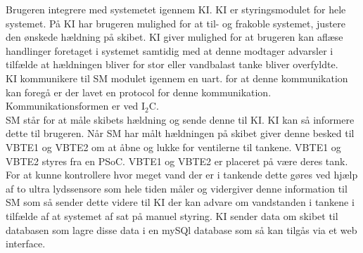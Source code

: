 Brugeren integrere med systemetet igennem KI. KI er styringsmodulet for hele systemet. På KI har brugeren mulighed for at til- og frakoble systemet, justere den ønskede hældning på skibet. KI giver mulighed for at brugeren kan aflæse handlinger foretaget i systemet samtidig med at denne modtager advarsler i tilfælde at hældningen bliver for stor eller vandbalast tanke bliver overfyldte.\\
KI kommunikere til SM modulet igennem en uart. for at denne kommunikation kan foregå er der lavet en protocol for denne kommunikation. Kommunikationsformen er ved I$_2$C.\\
SM står for at måle skibets hældning og sende denne til KI. KI kan så informere dette til brugeren. Når SM har målt hældningen på skibet giver denne besked til VBTE1 og VBTE2 om at åbne og lukke for ventilerne til tankene. VBTE1 og VBTE2 styres fra en PSoC. VBTE1 og VBTE2 er placeret på være deres tank. For at kunne kontrollere hvor meget vand der er i tankende dette gøres ved hjælp af to ultra lydssensore som hele tiden måler og vidergiver denne information til SM som så sender dette videre til KI der kan advare om vandstanden i tankene i tilfælde af at systemet af sat på manuel styring.
KI sender data om skibet til databasen som lagre disse data i en mySQl database som så kan tilgås via et web interface.